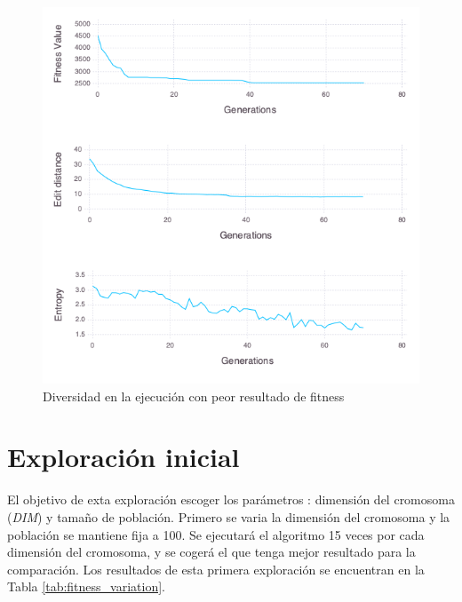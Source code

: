 \begin{figure}[]
	\centering	
	\includegraphics[scale=0.5]{figuras/config_file_1_Rastrigin_worst_f_value.png}
	\caption{ Diversidad en la ejecución con peor resultado de fitness }
    \label{fig:worst_f_value}
\end{figure}

\section{Exploración inicial}

El objetivo de exta exploración escoger los parámetros : dimensión del cromosoma (\textit{DIM}) y tamaño de población. Primero se varia la dimensión
del cromosoma y la población se mantiene fija a 100. Se ejecutará el algoritmo 15 veces por cada dimensión del cromosoma, y se cogerá el que 
tenga mejor resultado para la comparación. Los resultados de esta primera exploración se encuentran en la Tabla \ref{tab:fitness_variation}. 



